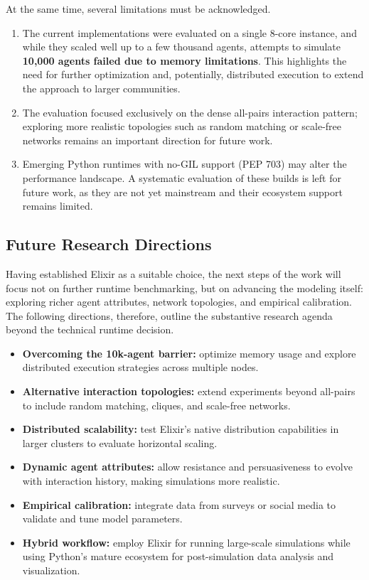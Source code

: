 \documentclass[
]{ceurart}
\begin{document}
At the same time, several limitations must be acknowledged. 
\begin{enumerate}
    \item The current implementations were evaluated on a single 8-core instance, and while they scaled well up to a few thousand agents, attempts to simulate \textbf{10,000 agents failed due to memory limitations}. This highlights the need for further optimization and, potentially, distributed execution to extend the approach to larger communities. 
    \item The evaluation focused exclusively on the dense all-pairs interaction pattern; exploring more realistic topologies such as random matching or scale-free networks remains an important direction for future work. 
    \item Emerging Python runtimes with no-GIL support (PEP 703) may alter the performance landscape. A systematic evaluation of these builds is left for future work, as they are not yet mainstream and their ecosystem support remains limited.
\end{enumerate}


\subsection{Future Research Directions}
Having established Elixir as a suitable choice, the next steps of the work will focus not on further runtime benchmarking, but on advancing the modeling itself: exploring richer agent attributes, network topologies, and empirical calibration. The following directions, therefore, outline the substantive research agenda beyond the technical runtime decision.
\begin{itemize}
	\item \textbf{Overcoming the 10k-agent barrier:} optimize memory usage and explore distributed execution strategies across multiple nodes.
	\item \textbf{Alternative interaction topologies:} extend experiments beyond all-pairs to include random matching, cliques, and scale-free networks.
	\item \textbf{Distributed scalability:} test Elixir’s native distribution capabilities in larger clusters to evaluate horizontal scaling.
	\item \textbf{Dynamic agent attributes:} allow resistance and persuasiveness to evolve with interaction history, making simulations more realistic.
	\item \textbf{Empirical calibration:} integrate data from surveys or social media to validate and tune model parameters.
    \item \textbf{Hybrid workflow:} employ Elixir for running large-scale simulations while using Python’s mature ecosystem for post-simulation data analysis and visualization.
\end{itemize}
\end{document}
